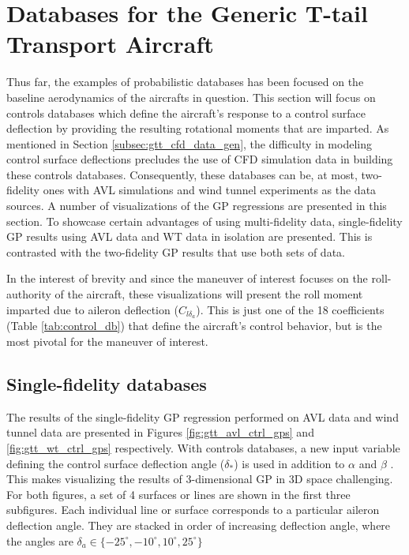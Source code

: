 \section{Databases for the Generic T-tail Transport Aircraft} \label{sec:gtt_dbs}

Thus far, the examples of probabilistic databases has been focused on the baseline aerodynamics of the aircrafts in question. 
This section will focus on controls databases which define the aircraft's response to a control surface deflection by providing the resulting rotational moments that are imparted. 
As mentioned in Section \ref{subsec:gtt_cfd_data_gen}, the difficulty in modeling control surface deflections precludes the use of CFD simulation data in building these controls databases. 
Consequently, these databases can be, at most, two-fidelity ones with AVL simulations and wind tunnel experiments as the data sources. 
A number of visualizations of the GP regressions are presented in this section.
To showcase certain advantages of using multi-fidelity data, single-fidelity GP results using AVL data and WT data in isolation are presented.
This is contrasted with the two-fidelity GP results that use both sets of data. 

In the interest of brevity and since the maneuver of interest focuses on the roll-authority of the aircraft, these visualizations will present the roll moment imparted due to aileron deflection ($C_{l{\delta_a}}$).
This is just one of the 18 coefficients (Table \ref{tab:control_db}) that define the aircraft's control behavior, but is the most pivotal for the maneuver of interest. 

\subsection{Single-fidelity databases}
The results of the single-fidelity GP regression performed on AVL data and wind tunnel data are presented in Figures \ref{fig:gtt_avl_ctrl_gps} and \ref{fig:gtt_wt_ctrl_gps} respectively. 
With controls databases, a new input variable defining the control surface deflection angle ($\delta_*$) is used in addition to $\alpha$ and $\beta$ .
This makes visualizing the results of 3-dimensional GP in 3D space challenging. 
For both figures, a set of 4 surfaces or lines are shown in the first three subfigures. 
Each individual line or surface corresponds to a particular aileron deflection angle.
They are stacked in order of increasing deflection angle, where the angles are $\delta_a \in \{-25^\circ, -10^\circ, 10^\circ, 25^\circ\}$



